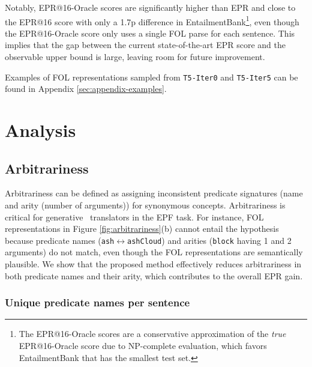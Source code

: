Notably, EPR@16-Oracle scores are significantly higher than EPR and close to the EPR@16 score with only a 1.7p difference in EntailmentBank\footnote{The EPR@16-Oracle scores are a conservative approximation of the \textit{true} EPR@16-Oracle score due to NP-complete evaluation, which favors EntailmentBank that has the smallest test set.}, even though the EPR@16-Oracle score only uses a single FOL parse for each sentence. This implies that the gap between the current state-of-the-art EPR score and the observable upper bound is large, leaving room for future improvement.

Examples of FOL representations sampled from \texttt{T5-Iter0} and \texttt{T5-Iter5} can be found in Appendix \ref{sec:appendix-examples}.

\section{Analysis}
\label{sec:analysis}


\subsection{Arbitrariness}
\label{sec:arbitrariness}

Arbitrariness can be defined as assigning inconsistent predicate signatures (name and arity (number of arguments)) for synonymous concepts. Arbitrariness is critical for generative \nltofol\ translators in the EPF task. For instance, FOL representations in Figure \ref{fig:arbitrariness}(b) cannot entail the hypothesis because predicate names (\texttt{ash}$\leftrightarrow$\texttt{ashCloud}) and arities (\texttt{block} having 1 and 2 arguments) do not match, even though the FOL representations are semantically plausible.
We show that the proposed method effectively reduces arbitrariness in both predicate names and their arity, which contributes to the overall EPR gain.

\subsubsection{Unique predicate names per sentence}

